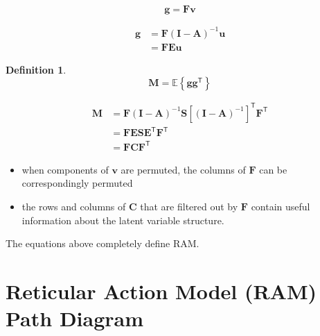 \documentclass[
]{book}
\providecommand{\tightlist}{%
  \setlength{\itemsep}{0pt}\setlength{\parskip}{0pt}}
\theoremstyle{definition}
\newtheorem{definition}{Definition}[chapter]
\theoremstyle{definition}
\theoremstyle{definition}
\theoremstyle{remark}
\begin{document}
\begin{equation}
  \mathbf{g}
  =
  \mathbf{F}
  \mathbf{v}
\end{equation}

\begin{equation}
  \begin{split}
    \mathbf{g}
    &=
    \mathbf{F} \left( \mathbf{I} - \mathbf{A} \right)^{-1} \mathbf{u} \\
    &=
    \mathbf{F} \mathbf{E} \mathbf{u}
  \end{split}
\end{equation}

\begin{definition}
\protect\hypertarget{def:unnamed-chunk-8}{}{\label{def:unnamed-chunk-8} }\begin{equation}
  \mathbf{M}
  =
  \mathbb{E}
  \left\{
    \mathbf{g}
    \mathbf{g}^{\mathsf{T}}
  \right\}
\end{equation}
\end{definition}

\begin{equation}
  \begin{split}
    \mathbf{M}
    &=
    \mathbf{F}
    \left( \mathbf{I} - \mathbf{A} \right)^{-1}
    \mathbf{S}
    \left[ \left( \mathbf{I} - \mathbf{A} \right)^{-1} \right]^{\mathsf{T}}
    \mathbf{F}^{\mathsf{T}} \\
    &=
    \mathbf{F}
    \mathbf{E} \mathbf{S} \mathbf{E}^{\mathsf{T}}
    \mathbf{F}^{\mathsf{T}} \\
    &=
    \mathbf{F}
    \mathbf{C}
    \mathbf{F}^{\mathsf{T}}
  \end{split}
\end{equation}

\begin{itemize}
\tightlist
\item
  when components of \(\mathbf{v}\) are permuted,
  the columns of \(\mathbf{F}\) can be correspondingly permuted
\item
  the rows and columns of \(\mathbf{C}\) that are filtered out by \(\mathbf{F}\)
  contain useful information about the latent variable structure.
\end{itemize}

The equations above completely define RAM.

\hypertarget{ram-diagram}{%
\chapter{Reticular Action Model (RAM) Path Diagram}\label{ram-diagram}}
\end{document}
